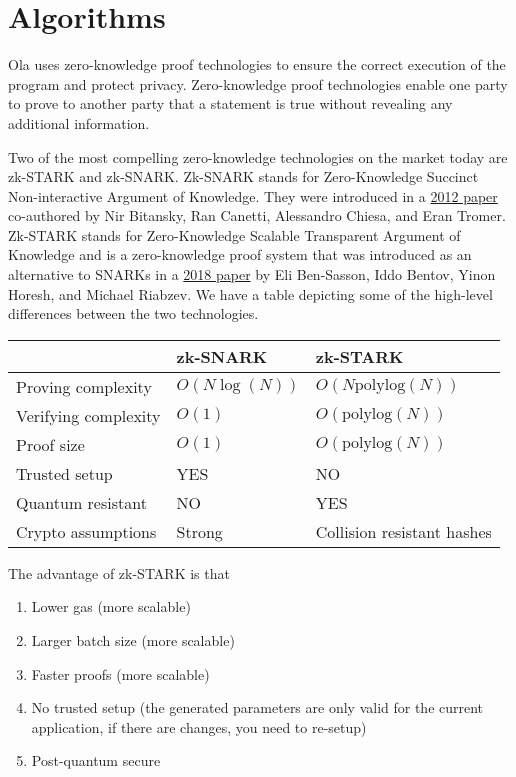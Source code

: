 \section{Algorithms} \label{sec:algorithms}
Ola uses zero-knowledge proof technologies to ensure the correct execution of the program and protect privacy. Zero-knowledge proof technologies enable one party to prove to another party that a statement is true without revealing any additional information. 

Two of the most compelling zero-knowledge technologies on the market today are zk-STARK and zk-SNARK. Zk-SNARK stands for Zero-Knowledge Succinct Non-interactive Argument of Knowledge. They were introduced in a \href{https://dl.acm.org/doi/10.1145/2090236.2090263}{2012 paper} co-authored by Nir Bitansky, Ran Canetti, Alessandro Chiesa, and Eran Tromer. Zk-STARK stands for Zero-Knowledge Scalable Transparent Argument of Knowledge and is a zero-knowledge proof system that was introduced as an alternative to SNARKs in a \href{https://starkware.co/wp-content/uploads/2022/05/STARK-paper.pdf}{2018 paper} by Eli Ben-Sasson, Iddo Bentov, Yinon Horesh, and Michael Riabzev. We have a table depicting some of the high-level differences between the two technologies.

\begin{table}[!ht]
    \centering
    \begin{tabular}{|l|l|l|}
        \hline
                            & zk-SNARK    & zk-STARK                   \\
        \hline
        Proving complexity   & $O(N\log(N))$ & $O(N\mathrm{polylog}(N))$            \\
        \hline
        Verifying complexity & $O(1)$        & $O(\mathrm{polylog}(N))$              \\
        \hline
        Proof size           & $O(1)$        & $O(\mathrm{polylog}(N))$              \\
        \hline
        Trusted setup        & YES         & NO                         \\
        \hline
        Quantum resistant    & NO          & YES                        \\
        \hline
        Crypto assumptions   & Strong      & Collision resistant hashes \\
        \hline
    \end{tabular}
\end{table}

\noindent The advantage of zk-STARK is that
\begin{enumerate}
    \item Lower gas (more scalable)
    \item Larger batch size (more scalable)
    \item Faster proofs (more scalable)
    \item No trusted setup (the generated parameters are only valid for the current application, if there are changes, you need to re-setup)
    \item Post-quantum secure
\end{enumerate}

